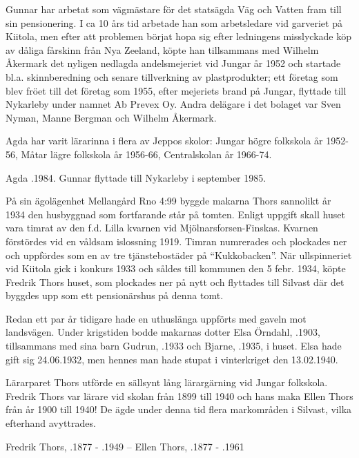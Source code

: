 Gunnar har arbetat som vägmästare för det statsägda Väg och Vatten fram till sin pensionering. I ca 10 års tid arbetade han som arbetsledare vid garveriet på Kiitola, men efter att problemen börjat hopa sig efter ledningens misslyckade köp av dåliga fårskinn från Nya Zeeland, köpte han tillsammans med Wilhelm Åkermark det nyligen nedlagda andelsmejeriet vid Jungar år 1952 och startade bl.a. skinnberedning och senare tillverkning av plastprodukter; ett företag som blev fröet till det företag som 1955, efter mejeriets brand på Jungar, flyttade till Nykarleby	under namnet  Ab Prevex Oy. Andra delägare i det bolaget var Sven	Nyman, Manne Bergman och Wilhelm Åkermark.

Agda har varit lärarinna i flera av Jeppos skolor: Jungar högre folkskola år 1952-56, Måtar lägre folkskola år 1956-66, Centralskolan år 1966-74.

Agda .1984. Gunnar flyttade till Nykarleby i september 1985.



På sin ägolägenhet Mellangård Rno 4:99 byggde makarna Thors sannolikt år 1934 den husbyggnad som fortfarande står på tomten. Enligt uppgift skall huset vara timrat av den f.d. Lilla kvarnen vid	Mjölnarsforsen-Finskas. Kvarnen förstördes vid en våldsam islossning 1919. Timran numrerades och plockades ner och uppfördes som	en av tre tjänstebostäder på ``Kukkobacken''. När ullspinneriet vid	Kiitola gick i konkurs 1933 och såldes till kommunen den 5 febr. 1934, köpte Fredrik Thors huset, som plockades ner på nytt och flyttades till Silvast där det byggdes upp som ett pensionärshus på denna tomt.

Redan ett par år tidigare hade en uthuslänga uppförts med gaveln	mot landsvägen. Under krigstiden bodde makarnas dotter Elsa Örndahl, .1903, tillsammans med sina barn Gudrun, .1933 och Bjarne, .1935, i huset. Elsa hade gift sig 24.06.1932, men hennes man hade stupat i vinterkriget den 13.02.1940.

Lärarparet Thors utförde en sällsynt lång lärargärning vid Jungar	folkskola. Fredrik Thors var lärare vid skolan från 1899 till 1940 och hans 	maka Ellen Thors från år 1900 till 1940! De ägde under denna tid flera markområden i Silvast, vilka efterhand avyttrades.

Fredrik Thors, .1877 - .1949  --  Ellen Thors, .1877 - .1961



